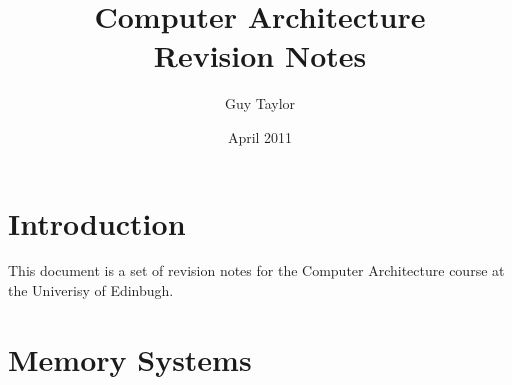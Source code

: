 \documentclass[11pt,twoside,a4paper]{article}
\begin{document}
  
  \title{Computer Architecture \\Revision Notes}
  \author{Guy Taylor}
  \date{April 2011}
  
  \maketitle
  
  \tableofcontents
  
  \section{Introduction}
    This document is a set of revision notes for the Computer Architecture \cite{car_home} course at the Univerisy of Edinbugh.
  
  \clearpage
  \section{Memory Systems}
        
  
  \clearpage  
  
  
\end{document}
